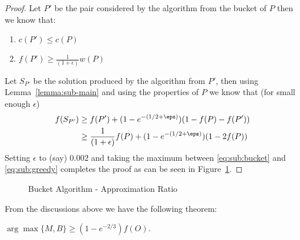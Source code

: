 \begin{proof}
	Let $P'$ be the pair considered by the algorithm from the bucket of $P$ then we know that:
	\begin{enumerate}
		\item $c(P') \leq c(P)$
		\item $f(P') \geq \frac{1}{(1 + \epsilon)}w(P)$
	\end{enumerate}
	Let $S_{P'}$ be the solution produced by the algorithm from $P'$,
	then using Lemma~\ref{lemma:sub-main} and using the properties of $P$ we know that (for small enough $\epsilon$)
	\begin{align}
		f(S_{P'}) & \geq f(P') + (1-e^{-(1/2 + \eps)})(1 - f(P) - f(P'))
		\\ & 
		\geq \frac{1}{(1 + \epsilon)}f(P) + (1-e^{-(1/2 + \eps)})(1 - 2f(P))
		\label{eq:sub:bucket}
	\end{align}
	Setting $\epsilon$ to (say) $0.002$ and taking the maximum between \ref{eq:sub:bucket} and
	\ref{eq:sub:greedy} completes the proof as can be seen in Figure~\ref{fig:sub:bucket}.
\end{proof}

\begin{figure}
	\def\zeta{0.002}
	\caption{
		\label{fig:sub:bucket}
		Bucket Algorithm - Approximation Ratio
	}
\end{figure}

From the discussions above we have the following theorem:

\begin{theorem}
	$\arg\max\{M, B\} \geq (1 - e^{-2/3})f(O)$.
\end{theorem}
